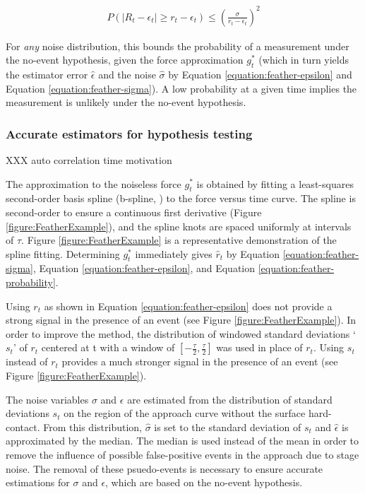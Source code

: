 \documentclass[%
  aip,12pt,tightenlines,
  amsthm,
 amsmath,amssymb
]{article}
\newcommand{\eqlab}[2]{
\begin{equation}
\label{equation:#2}
\begin{split}
#1
\end{split}
\end{equation}
}
\newcommand{\fRef}[1]{Figure \ref{figure:#1}}
\newcommand{\eRef}[1]{Equation \ref{equation:#1}}
\newcommand{\pl}[0]{\vspace{6pt}}
\begin{document}
\eqlab{ P( |R_t-\epsilon_t| \ge r_t-\epsilon_t ) \le
 (\frac{\sigma}{r_t-\epsilon_t})^2 }{feather-probability}


For \emph{any} noise distribution, this bounds the probability of a measurement under the no-event hypothesis, given the force approximation $g^{*}_t$ (which in turn yields the estimator error $\hat{\epsilon}$ and the noise $\hat{\sigma}$ by \eRef{feather-epsilon} and \eRef{feather-sigma}). A low probability at a given time implies the measurement is unlikely under the no-event hypothesis. \pl

\subsubsection{Accurate estimators for hypothesis testing}

XXX auto correlation time motivation \pl 

The approximation to the noiseless force $g^{*}_t$ is obtained by fitting a least-squares second-order basis spline (b-spline, ) to the force versus time curve. The spline is second-order to ensure a continuous first derivative (\fRef{FeatherExample}), and the spline knots are spaced uniformly at intervals of $\tau$. \fRef{FeatherExample} is a representative demonstration of the spline fitting. Determining  $g^{*}_t$ immediately gives $\hat{r}_t$ by  \eRef{feather-sigma}, \eRef{feather-epsilon}, and \eRef{feather-probability}. \pl

Using $r_t$ as shown in \eRef{feather-epsilon} does not provide a strong signal in the presence of an event (see \fRef{FeatherExample}). In order to improve the method, the distribution of windowed standard deviations `$s_t$' of $r_t$ centered at t with a window of $[-\frac{\tau}{2},\frac{\tau}{2}]$ was used in place of $r_t$. Using $s_t$ instead of $r_t$ provides a much stronger signal in the presence of an event (see \fRef{FeatherExample}).  \pl

The noise variables $\sigma$ and $\epsilon$ are estimated from the distribution of standard deviations $s_t$ on the region of the approach curve without the surface hard-contact. From this distribution, $\hat{\sigma}$ is set to the standard deviation of $s_t$ and $\hat{\epsilon}$ is approximated by the median. The median is used instead of the mean in order to remove the influence of possible false-positive events in the approach due to stage noise. The removal of these psuedo-events is necessary to ensure accurate estimations for $\sigma$ and $\epsilon$, which are based on the no-event hypothesis.
\end{document}
